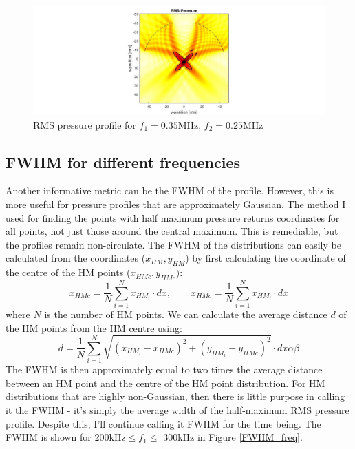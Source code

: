 \documentclass[10pt,a4paper]{article}
\begin{document}
\begin{figure}[!h]\label{f350kHz}
\hspace*{-5cm}                                                    
\includegraphics[scale=0.6]{f350kHz}
\caption{RMS pressure profile for $f_1 = 0.35$MHz, $f_2 = 0.25$MHz}
\end{figure}
\newpage

 \subsection{FWHM for different frequencies}

Another informative metric can be the FWHM of the profile. However, this is more useful for pressure profiles that are approximately Gaussian. The method I used for finding the points with half maximum pressure returns coordinates for all points, not just those around the central maximum. This is remediable, but the profiles remain non-circulate. The FWHM of the distributions can easily be calculated from the coordinates ($x_{HM},y_{HM}$) by first calculating the coordinate of the centre of the HM points ($x_{HMc}, y_{HMc})$:
\begin{equation}
x_{HMc} = \frac{1}{N} \sum_{i=1}^N x_{HM_i} \cdot dx, \quad \quad x_{HMc} = \frac{1}{N} \sum_{i=1}^N x_{HM_i} \cdot dx
\end{equation}
where $N$ is the number of HM points. We can calculate the average distance $d$ of the HM points from the HM centre using:
\begin{equation}
d = \frac{1}{N}  \sum_{i=1}^N \sqrt{ (x_{HM_i} - x_{HMc})^2 + (y_{HM_i} - y_{HMc})^2} \cdot dx \alpha \beta 
\end{equation}
The FWHM is then approximately equal to two times the average distance between an HM point and the centre of the HM point distribution. For HM distributions that are highly non-Gaussian, then there is little purpose in calling it the FWHM - it's simply the average width of the half-maximum RMS pressure profile. Despite this, I'll continue calling it FWHM for the time being. The FWHM is shown for 200kHz$\leq f_1 \leq$ 300kHz in Figure \ref{FWHM_freq}.
\end{document}
